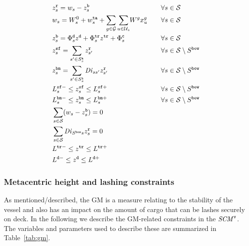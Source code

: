 \begin{alignat}{3}    
& z^{\ttt{r}}_{s} = w_{s} - z^{\ttt{b}}_{s}									&& \forall s\in\mc{S} \label{defResF} \\
& w_{s} = W^{0}_{s} + w^{\ttt{ta}}_{s} + \sum_{g\in \mc{G}} \so[r]{\sum_{u\in \mc{U}_s}}W^g x^{g}_{u} \quad
																			&& \forall s\in\mc{S} \label{defW} \\
& z^{\ttt{b}}_{s} 	= \Phi^{\ttt{d}}_{s} z^\ttt{d} + \Phi^{\ttt{tr}}_{s} z^\ttt{tr} + \Phi^{\ttt{c}}_{s} 	
																			&& \forall s\in\mc{S} \label{defBancy} \\
%                                                                             
& z^{\ttt{sf}}_{s} 	= \sum_{s'\in S^\ttt{a}_s} z^{\ttt{r}}_{s'}				&& \forall s\in\mc{S}\setminus S^\ttt{bow} \label{defShear} \\
& z^\ttt{bm}_s 		= \sum_{s'\in S^\ttt{a}_s} \mi{Di}_{ss'} z^\ttt{r}_{s'}	&& \forall s\in\mc{S}\setminus S^\ttt{bow} \label{defBending} \\
& L^{\ttt{sf}-}_{s} \leq z^{\ttt{sf}}_{s} \leq L^{\ttt{sf}+}_{s}			&& \forall s\in\mc{S}\setminus S^\ttt{bow} \label{limitsShear} \\    
& L^{\ttt{bm}-}_{s} \leq z^{\ttt{bm}}_{s} \leq L^{\ttt{bm}+}_{s}  			&& \forall s\in\mc{S}\setminus S^\ttt{bow} \label{limitsBending}\\
& \sum_{s\in\mc{S}} (w_{s}-z^\ttt{b}_s)  = 0								&& \label{noShearAtEnds} \\
& \sum_{s\in\mc{S}} \mi{Di}_{S^\ttt{bow}s} z^{\ttt{r}}_{s} = 0				&& \label{noMomentAtStern}\\
& L^{\ttt{tr}-}  	\leq z^\ttt{tr}    		\leq L^{\ttt{tr}+}				&& \label{trimLimits} \\
& L^{\ttt{d}-}	   	\leq z^\ttt{d}     		\leq L^{\ttt{d}+}				&& \label{draftLimits}
\end{alignat}

\subsubsection{Metacentric height and lashing constraints}
As mentioned/described, the GM is a measure relating to the stability of the vessel and also has an impact on the amount of cargo that can be lashes securely on deck. In the following we describe the GM-related constraints in the $\mathit{SCM}^\texttt{v}$. The variables and parameters used to describe these are summarized in Table~\ref{tab:gm}.

